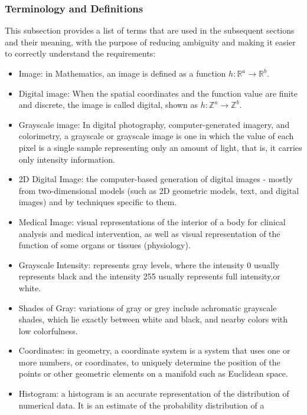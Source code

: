 \documentclass[12pt]{article}
\begin{document}
\subsubsection{Terminology and  Definitions}

This subsection provides a list of terms that are used in the subsequent
sections and their meaning, with the purpose of reducing ambiguity and making
it easier to correctly understand the requirements:

\begin{itemize}

\item Image: in Mathematics, an image is defined as a function
  $h : \mathbb{R}^{a} \rightarrow \mathbb{R}^{b}$.
\item Digital image: When the spatial coordinates and the function value are
  finite and discrete, the image is called digital, shown as
  $h : \mathbb{Z}^{a} \rightarrow \mathbb{Z}^{b}$.
\item Grayscale image: In digital photography, computer-generated imagery, and
  colorimetry, a grayscale or grayscale image is one in which the value of each
  pixel is a single sample representing only an amount of light, that is, it
  carries only intensity information.
\item 2D Digital Image: the computer-based generation of digital images -
mostly from two-dimensional models (such as 2D geometric models, text, and
digital
  images) and by techniques specific to them.
\item Medical Image: visual representations of the interior of a body for
  clinical analysis and medical intervention, as well as visual representation
  of the function of some organs or tissues (physiology).
\item Grayscale Intensity: represents gray levels, where the intensity 0
usually represents black and the intensity 255 usually represents full
intensity,or
  white.
\item Shades of Gray: variations of gray or grey include achromatic grayscale
  shades, which lie exactly between white and black, and nearby colors with low
  colorfulness.
\item Coordinates: in geometry, a coordinate system is a system that uses one
or more numbers, or coordinates, to uniquely determine the position of the
points or other geometric elements on a manifold such as Euclidean space.
\item Histogram: a histogram is an accurate representation of the distribution
  of numerical data. It is an estimate of the probability distribution of a

\end{itemize}
\end{document}
